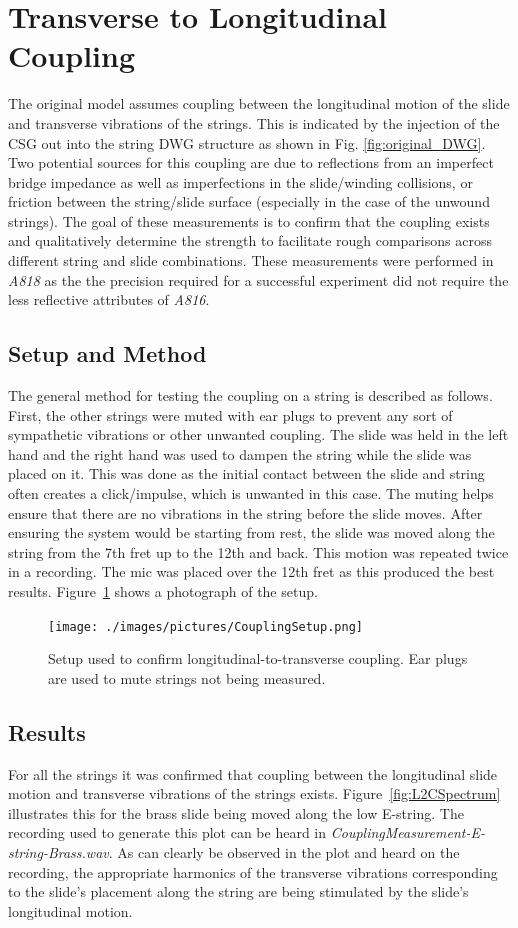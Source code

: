 \documentclass[../main.tex]{subfiles}
\begin{document}
\section{Transverse to Longitudinal Coupling}
The original model assumes coupling between the longitudinal motion of the slide and transverse vibrations of the strings. This is indicated by the injection of the CSG out into the string DWG structure as shown in Fig. \ref{fig:original_DWG}. Two potential sources for this coupling are due to reflections from an imperfect bridge impedance as well as imperfections in the slide/winding collisions, or friction between the string/slide surface (especially in the case of the unwound strings). The goal of these measurements is to confirm that the coupling exists and qualitatively determine the strength to facilitate rough comparisons across different string and slide combinations. These measurements were performed in \emph{A818} as the the precision required for a successful experiment did not require the less reflective attributes of \emph{A816}.

\subsection{Setup and Method}
The general method for testing the coupling on a string is described as follows. First, the other strings were muted with ear plugs to prevent any sort of sympathetic vibrations or other unwanted coupling. The slide was held in the left hand and the right hand was used to dampen the string while the slide was placed on it. This was done as the initial contact between the slide and string often creates a click/impulse, which is unwanted in this case. The muting helps ensure that there are no vibrations in the string before the slide moves. After ensuring the system would be starting from rest, the slide was moved along the string from the 7th fret up to the 12th and back. This motion was repeated twice in a recording. The mic was placed over the 12th fret as this produced the best results. Figure~\ref{fig:CouplingSetup} shows a photograph of the setup.

\begin{figure}[h]
    \centering
    \texttt{[image: ./images/pictures/CouplingSetup.png]}
    \caption{Setup used to confirm longitudinal-to-transverse coupling. Ear plugs are used to mute strings not being measured.}
    \label{fig:CouplingSetup}
\end{figure}

\subsection{Results}
For all the strings it was confirmed that coupling between the longitudinal slide motion and transverse vibrations of the strings exists. Figure~\ref{fig:L2CSpectrum} illustrates this for the brass slide being moved along the low E-string. The recording used to generate this plot can be heard in \emph{CouplingMeasurement-E-string-Brass.wav}. As can clearly be observed in the plot and heard on the recording, the appropriate harmonics of the transverse vibrations corresponding to the slide's placement along the string are being stimulated by the slide's longitudinal motion.
\end{document}
